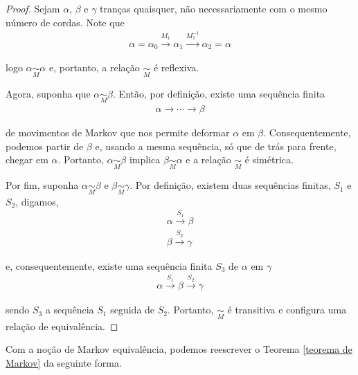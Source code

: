 \documentclass[a4paper,portuguese,11pt,twoside, leqno]{book}
\theoremstyle{definition}
\begin{document}
	\begin{proof}
		Sejam $\alpha$, $\beta$ e $\gamma$ tranças quaisquer, não necessariamente com o mesmo número de cordas. Note que 
		\begin{align*}
		\alpha = \alpha_0\overset{M_1}{\to}\alpha_1\overset{M_1^{-1}}{\to}\alpha_2 = \alpha
		\end{align*}
		\par\vspace{0.3cm} logo $\alpha\underset{M}{\sim}\alpha$ e, portanto, a relação $\underset{M}{\sim}$ é reflexiva.
		\par\vspace{0.3cm} Agora, suponha que $\alpha\underset{M}{\sim}\beta$. Então, por definição, existe uma sequência finita
		\begin{align*}
		\alpha\to\cdots\to\beta 
		\end{align*}
		\par\vspace{0.3cm} de movimentos de Markov que nos permite deformar $\alpha$ em $\beta$. Consequentemente, podemos partir de $\beta$ e, usando a mesma sequência, só que de trás para frente, chegar em $\alpha$. Portanto, $\alpha\underset{M}{\sim}\beta$ implica $\beta\underset{M}{\sim}\alpha$ e a relação $\underset{M}{\sim}$ é simétrica.
		\par\vspace{0.3cm} Por fim, suponha $\alpha\underset{M}{\sim}\beta$ e $\beta\underset{M}{\sim}\gamma$. Por definição, existem duas sequências finitas, $S_1$ e $S_2$, digamos, 
		\begin{align*}
		\alpha\overset{S_1}{\to}\beta \\
		\beta\overset{S_2}{\to}\gamma 	
		\end{align*}
		\par\vspace{0.3cm} e, consequentemente, existe uma sequência finita $S_3$ de $\alpha$ em $\gamma$
		\begin{align*}
		\alpha\overset{S_1}{\to}\beta\overset{S_2}{\to}\gamma 
		\end{align*}
		\par\vspace{0.3cm} sendo $S_3$ a sequência $S_1$ seguida de $S_2$. Portanto, $\underset{M}{\sim}$ é transitiva e configura uma relação de equivalência.
	\end{proof}
	\par\vspace{0.3cm} Com a noção de Markov equivalência, podemos reescrever o Teorema \eqref{teorema de Markov} da seguinte forma.
\end{document}
